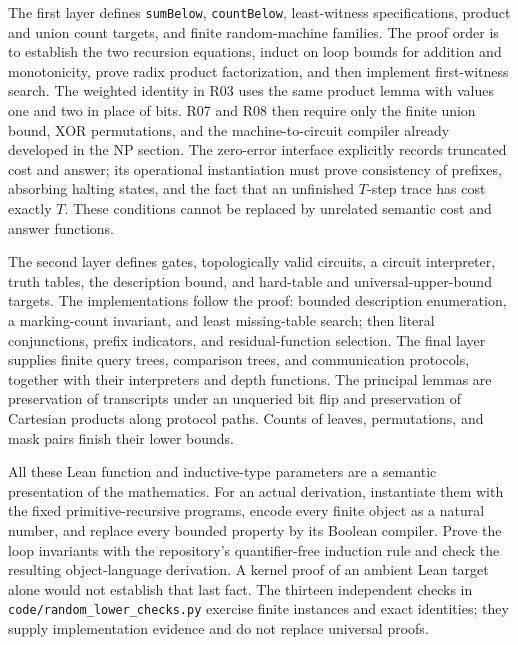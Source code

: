The first layer defines \texttt{sumBelow}, \texttt{countBelow}, least-witness
specifications, product and union count targets, and finite random-machine
families. The proof order is to establish the two recursion equations,
induct on loop bounds for addition and monotonicity, prove radix product
factorization, and then implement first-witness search. The weighted identity
in R03 uses the same product lemma with values one and two in place of bits.
R07 and R08 then require only the finite union bound, XOR permutations,
and the machine-to-circuit compiler already developed in the NP section.
The zero-error interface explicitly records truncated cost and answer;
its operational instantiation must prove consistency of prefixes,
absorbing halting states, and the fact that an unfinished $T$-step trace
has cost exactly $T$. These conditions cannot be replaced by unrelated
semantic cost and answer functions.

The second layer defines gates, topologically valid circuits, a circuit
interpreter, truth tables, the description bound, and hard-table and
universal-upper-bound targets. The implementations follow the proof:
bounded description enumeration, a marking-count invariant, and least
missing-table search; then literal conjunctions, prefix indicators, and
residual-function selection. The final layer supplies finite query trees,
comparison trees, and communication protocols, together with their
interpreters and depth functions. The principal lemmas are preservation of
transcripts under an unqueried bit flip and preservation of Cartesian
products along protocol paths. Counts of leaves, permutations, and mask
pairs finish their lower bounds.

All these Lean function and inductive-type parameters are a semantic
presentation of the mathematics. For an actual \ipra{} derivation, instantiate
them with the fixed primitive-recursive programs, encode every finite object
as a natural number, and replace every bounded property by its Boolean
compiler. Prove the loop invariants with the repository's quantifier-free
induction rule and check the resulting object-language derivation. A kernel
proof of an ambient Lean target alone would not establish that last fact.
The thirteen independent checks in \texttt{code/random\_lower\_checks.py}
exercise finite instances and exact identities; they supply implementation
evidence and do not replace universal proofs.

